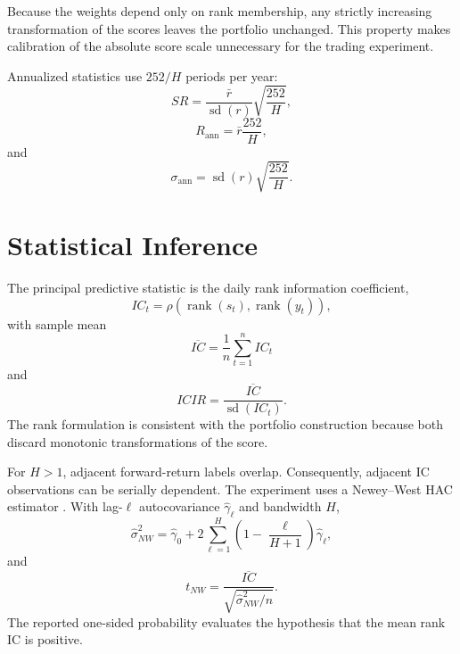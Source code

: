 \documentclass[10pt]{article}
\begin{document}
Because the weights depend only on rank membership, any strictly increasing transformation of the scores leaves the portfolio unchanged. This property makes calibration of the absolute score scale unnecessary for the trading experiment.

Annualized statistics use $252/H$ periods per year:
\begin{equation}
SR=
\frac{\bar r}{\operatorname{sd}(r)}
\sqrt{\frac{252}{H}},
\end{equation}
\begin{equation}
R_{\mathrm{ann}}
=
\bar r\frac{252}{H},
\end{equation}
and
\begin{equation}
\sigma_{\mathrm{ann}}
=
\operatorname{sd}(r)
\sqrt{\frac{252}{H}}.
\end{equation}

\section{Statistical Inference}

The principal predictive statistic is the daily rank information coefficient,
\begin{equation}
IC_t
=
\rho
\left(
\operatorname{rank}(s_t),
\operatorname{rank}(y_t)
\right),
\end{equation}
with sample mean
\begin{equation}
\overline{IC}
=
\frac1n\sum_{t=1}^{n}IC_t
\end{equation}
and
\begin{equation}
ICIR=
\frac{\overline{IC}}
{\operatorname{sd}(IC_t)}.
\end{equation}
The rank formulation is consistent with the portfolio construction because both discard monotonic transformations of the score.

For $H>1$, adjacent forward-return labels overlap. Consequently, adjacent IC observations can be serially dependent. The experiment uses a Newey--West HAC estimator \citep{neweywest1987}. With lag-$\ell$ autocovariance $\hat\gamma_\ell$ and bandwidth $H$,
\begin{equation}
\widehat{\sigma}_{NW}^{2}
=
\hat\gamma_0+
2\sum_{\ell=1}^{H}
\left(1-\frac{\ell}{H+1}\right)
\hat\gamma_\ell,
\end{equation}
and
\begin{equation}
t_{NW}
=
\frac{\overline{IC}}
{\sqrt{\widehat{\sigma}_{NW}^{2}/n}}.
\end{equation}
The reported one-sided probability evaluates the hypothesis that the mean rank IC is positive.
\end{document}

